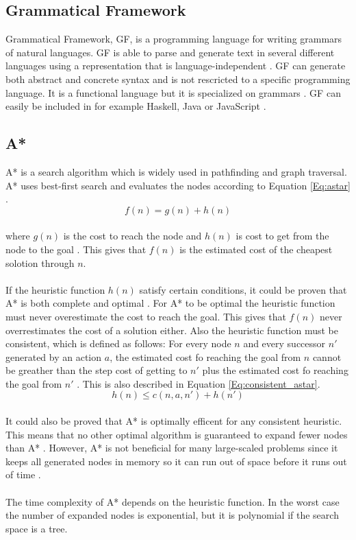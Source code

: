 \subsection{Grammatical Framework}
Grammatical Framework, GF, is a programming language for writing grammars of natural languages. GF is able to parse and generate text in several different languages using a representation that is language-independent \citep{gf_url}. GF can generate both abstract and concrete syntax and is not rescricted to a specific programming language. It is a functional language but it is specialized on grammars \citep{gf_url}. 
GF can easily be included in for example Haskell, Java or JavaScript \citep{gf_url}.

\subsection{A*}
A* is a search algorithm which is widely used in pathfinding and graph traversal. A* uses best-first search and evaluates the nodes according to Equation \ref{Eq:astar} \citep{astar_ai}. \\
\begin{equation}
f(n) = g(n) + h(n)
\label{Eq:astar}
\end{equation}\\
where $g(n)$ is the cost to reach the node and $h(n)$ is cost to get from the node to the goal \citep{astar_ai}. This gives that $f(n)$ is the estimated cost of the cheapest solotion through $n$. 
\\\\
If the heuristic function $h(n)$ satisfy certain conditions, it could be proven that A* is both complete and optimal \citep{astar_ai}. For A* to be optimal the heuristic function must never overestimate the cost to reach the goal. This gives that $f(n)$ never overrestimates the cost of a solution either. Also the heuristic function must be consistent, which is defined as follows: For every node $n$ and every successor $n'$ generated by an action $a$, the estimated cost fo reaching the goal from $n$ cannot be greather than the step cost of getting to $n'$ plus the estimated cost fo reaching the goal from $n'$ \citep{astar_ai}. This is also described in Equation \ref{Eq:consistent_astar}.\\
\begin{equation}
h(n) \leq c(n, a, n') + h(n')
\label{Eq:consistent_astar}
\end{equation}\\
It could also be proved that A* is optimally efficent for any consistent heuristic. This means that no other optimal algorithm is guaranteed to expand fewer nodes than A* \citep{astar_ai}. However, A* is not beneficial for many large-scaled problems since it keeps all generated nodes in memory so it can run out of space before it runs out of time \citep{astar_ai}.\\\\
The time complexity of A* depends on the heuristic function. In the worst case the number of expanded nodes is exponential, but it is polynomial if the search space is a tree.
